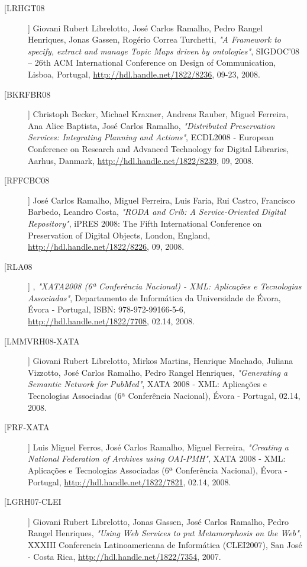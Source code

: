 \begin{description}
\item[[LRHGT08]]
    \textsf{Giovani Rubert Librelotto, José Carlos Ramalho, Pedro Rangel Henriques, Jonas Gassen, Rogério Correa Turchetti}, \emph{"A Framework to specify, extract and manage Topic Maps driven by ontologies"}, SIGDOC'08 -- 26th ACM International Conference on Design of Communication, Lisboa, Portugal, \url{http://hdl.handle.net/1822/8236}, 09-23, 2008.

\item[[BKRFBR08]]
    \textsf{Christoph Becker, Michael Kraxner, Andreas Rauber, Miguel Ferreira, Ana Alice Baptista, José Carlos Ramalho}, \emph{"Distributed Preservation Services: Integrating Planning and Actions"}, ECDL2008 - European Conference on Research and Advanced Technology for Digital Libraries, Aarhus, Danmark, \url{http://hdl.handle.net/1822/8239}, 09, 2008.

\item[[RFFCBC08]]
    \textsf{José Carlos Ramalho, Miguel Ferreira, Luis Faria, Rui Castro, Francisco Barbedo, Leandro Costa}, \emph{"RODA and Crib: A Service-Oriented Digital Repository"}, iPRES 2008: The Fifth International Conference on Preservation of Digital Objects, London, England, \url{http://hdl.handle.net/1822/8226}, 09, 2008.

\item[[RLA08]]
    \textsf{}, \emph{"XATA2008 (6ª Conferência Nacional) - XML: Aplicações e Tecnologias Associadas"}, Departamento de Informática da Universidade de Évora, Évora - Portugal, ISBN: 978-972-99166-5-6, \url{http://hdl.handle.net/1822/7708}, 02.14, 2008.

\item[[LMMVRH08-XATA]]
    \textsf{Giovani Rubert Librelotto, Mirkos Martins, Henrique Machado, Juliana Vizzotto, José Carlos Ramalho, Pedro Rangel Henriques}, \emph{"Generating a Semantic Network for PubMed"}, XATA 2008 -  XML: Aplicações e Tecnologias Associadas (6ª Conferência Nacional), Évora - Portugal, 02.14, 2008.

\item[[FRF-XATA]]
    \textsf{Luis Miguel Ferros, José Carlos Ramalho, Miguel Ferreira}, \emph{"Creating a National Federation of Archives using OAI-PMH"}, XATA 2008 -  XML: Aplicações e Tecnologias Associadas (6ª Conferência Nacional), Évora - Portugal, \url{http://hdl.handle.net/1822/7821}, 02.14, 2008.

\item[[LGRH07-CLEI]]
    \textsf{Giovani Rubert Librelotto, Jonas Gassen, José Carlos Ramalho, Pedro Rangel Henriques}, \emph{"Using Web Services to put Metamorphosis on the Web"}, XXXIII Conferencia Latinoamericana de Informática (CLEI2007), San José - Costa Rica, \url{http://hdl.handle.net/1822/7354}, 2007.


\end{description}
